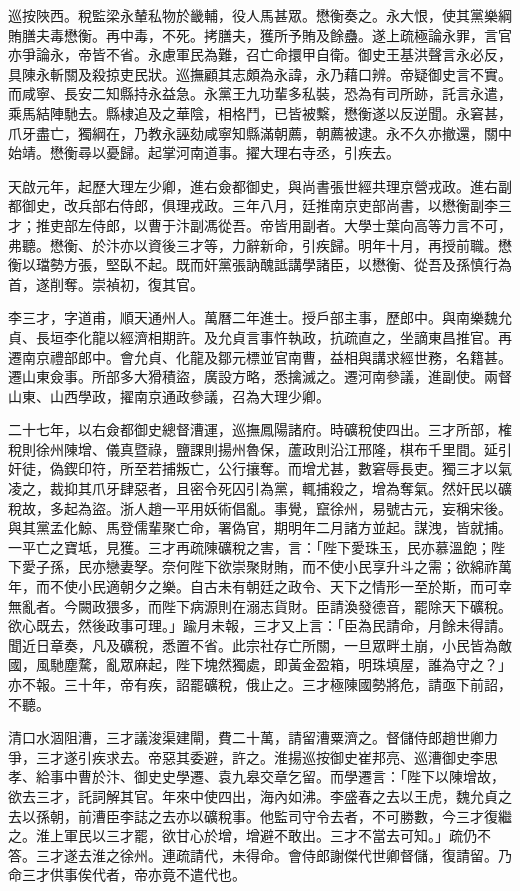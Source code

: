 \begin{pinyinscope}
巡按陜西。稅監梁永輦私物於畿輔，役人馬甚眾。懋衡奏之。永大恨，使其黨樂綱賄膳夫毒懋衡。再中毒，不死。拷膳夫，獲所予賄及餘蠱。遂上疏極論永罪，言官亦爭論永，帝皆不省。永慮軍民為難，召亡命擐甲自衛。御史王基洪聲言永必反，具陳永斬關及殺掠吏民狀。巡撫顧其志頗為永諱，永乃藉口辨。帝疑御史言不實。而咸寧、長安二知縣持永益急。永黨王九功輩多私裝，恐為有司所跡，託言永遣，乘馬結陣馳去。縣棣追及之華陰，相格鬥，已皆被繫，懋衡遂以反逆聞。永窘甚，爪牙盡亡，獨綱在，乃教永誣劾咸寧知縣滿朝薦，朝薦被逮。永不久亦撤還，關中始靖。懋衡尋以憂歸。起掌河南道事。擢大理右寺丞，引疾去。

天啟元年，起歷大理左少卿，進右僉都御史，與尚書張世經共理京營戎政。進右副都御史，改兵部右侍郎，俱理戎政。三年八月，廷推南京吏部尚書，以懋衡副李三才；推吏部左侍郎，以曹于汴副馮從吾。帝皆用副者。大學士葉向高等力言不可，弗聽。懋衡、於汴亦以資後三才等，力辭新命，引疾歸。明年十月，再授前職。懋衡以璫勢方張，堅臥不起。既而奸黨張訥醜詆講學諸臣，以懋衡、從吾及孫慎行為首，遂削奪。崇禎初，復其官。

李三才，字道甫，順天通州人。萬曆二年進士。授戶部主事，歷郎中。與南樂魏允貞、長垣李化龍以經濟相期許。及允貞言事忤執政，抗疏直之，坐謫東昌推官。再遷南京禮部郎中。會允貞、化龍及鄒元標並官南曹，益相與講求經世務，名籍甚。遷山東僉事。所部多大猾積盜，廣設方略，悉擒滅之。遷河南參議，進副使。兩督山東、山西學政，擢南京通政參議，召為大理少卿。

二十七年，以右僉都御史總督漕運，巡撫鳳陽諸府。時礦稅使四出。三才所部，榷稅則徐州陳增、儀真暨祿，鹽課則揚州魯保，蘆政則沿江邢隆，棋布千里間。延引奸徒，偽鍥印符，所至若捕叛亡，公行攘奪。而增尤甚，數窘辱長吏。獨三才以氣凌之，裁抑其爪牙肆惡者，且密令死囚引為黨，輒捕殺之，增為奪氣。然奸民以礦稅故，多起為盜。浙人趙一平用妖術倡亂。事覺，竄徐州，易號古元，妄稱宋後。與其黨孟化鯨、馬登儒輩聚亡命，署偽官，期明年二月諸方並起。謀洩，皆就捕。一平亡之寶坻，見獲。三才再疏陳礦稅之害，言：「陛下愛珠玉，民亦慕溫飽；陛下愛子孫，民亦戀妻孥。奈何陛下欲崇聚財賄，而不使小民享升斗之需；欲綿祚萬年，而不使小民適朝夕之樂。自古未有朝廷之政令、天下之情形一至於斯，而可幸無亂者。今闕政猥多，而陛下病源則在溺志貨財。臣請渙發德音，罷除天下礦稅。欲心既去，然後政事可理。」踰月未報，三才又上言：「臣為民請命，月餘未得請。聞近日章奏，凡及礦稅，悉置不省。此宗社存亡所關，一旦眾畔土崩，小民皆為敵國，風馳塵騖，亂眾麻起，陛下塊然獨處，即黃金盈箱，明珠填屋，誰為守之？」亦不報。三十年，帝有疾，詔罷礦稅，俄止之。三才極陳國勢將危，請亟下前詔，不聽。

清口水涸阻漕，三才議浚渠建閘，費二十萬，請留漕粟濟之。督儲侍郎趙世卿力爭，三才遂引疾求去。帝惡其委避，許之。淮揚巡按御史崔邦亮、巡漕御史李思孝、給事中曹於汴、御史史學遷、袁九皋交章乞留。而學遷言：「陛下以陳增故，欲去三才，託詞解其官。年來中使四出，海內如沸。李盛春之去以王虎，魏允貞之去以孫朝，前漕臣李誌之去亦以礦稅事。他監司守令去者，不可勝數，今三才復繼之。淮上軍民以三才罷，欲甘心於增，增避不敢出。三才不當去可知。」疏仍不答。三才遂去淮之徐州。連疏請代，未得命。會侍郎謝傑代世卿督儲，復請留。乃命三才供事俟代者，帝亦竟不遣代也。


\end{pinyinscope}
